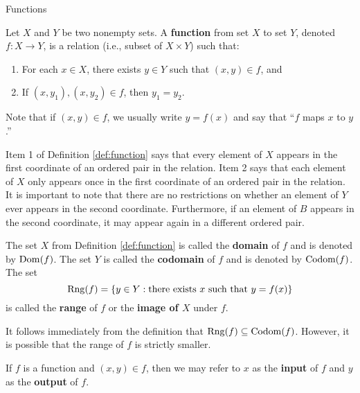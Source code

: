 \begin{section}{Functions}

\begin{definition}
Let \(X\) and \(Y\) be two nonempty sets.  A \textbf{function} from set \(X\) to set \(Y\), denoted \(f:X\to Y\), is a relation (i.e., subset of \(X\times Y\)) such that:

\begin{enumerate}\label{def:function}
\item For each \(x\in X\), there exists \(y\in Y\) such that \((x,y)\in f\), and
\item If \((x,y_{1}), (x,y_{2}) \in f\), then \(y_{1}=y_{2}\).
\end{enumerate}
Note that if \((x,y)\in f\), we usually write \(y=f(x)\) and say that ``\(f\) maps \(x\) to \(y\).''
\end{definition}

\begin{remark}
Item 1 of Definition \ref{def:function} says that every element of \(X\) appears in the first coordinate of an ordered pair in the relation.  Item 2 says that each element of \(X\) only appears once in the first coordinate of an ordered pair in the relation.  It is important to note that there are no restrictions on whether an element of \(Y\) ever appears in the second coordinate.  Furthermore, if an element of \(B\) appears in the second coordinate, it may appear again in a different ordered pair.
\end{remark}

\begin{definition}
The set \(X\) from Definition \ref{def:function} is called the \textbf{domain} of \(f\) and is denoted by \(\operatorname{Dom}(f)\).  The set \(Y\) is called the \textbf{codomain} of \(f\) and is denoted by \(\operatorname{Codom}(f)\).  The set
\[
\operatorname{Rng}(f)=\{y\in Y: \mbox{there exists }x\mbox{ such that } y=f(x)\}
\]
is called the \textbf{range} of \(f\) or the \textbf{image of \(X\)} under \(f\).
\end{definition}

\begin{remark}
It follows immediately from the definition that \(\operatorname{Rng}(f)\subseteq \operatorname{Codom}(f)\).  However, it is possible that the range of \(f\) is strictly smaller.
\end{remark}

\begin{remark}
If \(f\) is a function and \((x,y)\in f\), then we may refer to \(x\) as the \textbf{input} of \(f\) and \(y\) as the \textbf{output} of \(f\).
\end{remark}


\end{section}
